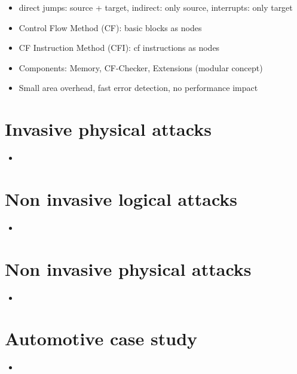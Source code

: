 \documentclass[11pt, paper=a4, twocolumn]{scrartcl}
\begin{document}
\begin{itemize}
\begin{itemize}
\begin{itemize}
							\item direct jumps: source + target, indirect: only source, interrupts: only target
							\item Control Flow Method (CF): basic blocks as nodes
							\item CF Instruction Method (CFI): cf instructions as nodes
							\item Components: Memory, CF-Checker, Extensions (modular concept)
							\item Small area overhead, fast error detection, no performance impact
						\end{itemize}
				\end{itemize}

		\end{itemize}

	\section{Invasive physical attacks}
		\begin{itemize}
			\item 
		\end{itemize}

	\section{Non invasive logical attacks}
		\begin{itemize}
			\item 
		\end{itemize}

	\section{Non invasive physical attacks}
		\begin{itemize}
			\item 
		\end{itemize}

	\section{Automotive case study}
		\begin{itemize}
			\item 
		\end{itemize}
\end{document}
